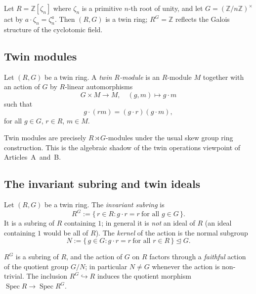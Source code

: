 \documentclass[11pt,a4paper]{article}
\numberwithin{equation}{section}
\newcommand{\Z}{\mathbb{Z}}
\DeclareMathOperator{\Spec}{Spec}
\begin{document}
	\begin{example}
		Let $R=\Z[\zeta_n]$ where $\zeta_n$ is a primitive $n$-th root of unity, and let 
		$G=(\Z/n\Z)^\times$ act by $a\cdot\zeta_n=\zeta_n^a$.
		Then $(R,G)$ is a twin ring; $R^G=\Z$ reflects the Galois structure of the cyclotomic field.
	\end{example}
	
	\subsection{Twin modules}
	
	\begin{definition}
		Let $(R,G)$ be a twin ring.
		A \emph{twin $R$-module} is an $R$-module $M$ together with an action of $G$ by 
		$R$-linear automorphisms
		\[
		G\times M\to M,\quad (g,m)\mapsto g\cdot m
		\]
		such that
		\[
		g\cdot(rm) = (g\cdot r)(g\cdot m),
		\]
		for all $g\in G$, $r\in R$, $m\in M$.
	\end{definition}
	
	\begin{remark}
		Twin modules are precisely $R\rtimes G$-modules under the usual skew group ring construction.
		This is the algebraic shadow of the twin operations viewpoint of Articles~A~and~B.
	\end{remark}
	
	\subsection{The invariant subring and twin ideals}
	
	\begin{definition}
		Let $(R,G)$ be a twin ring.
		The \emph{invariant subring} is
		\[
		R^G := \{\, r\in R : g\cdot r = r\ \text{for all } g\in G\,\}.
		\]
		It is a subring of $R$ containing $1$; in general it is \emph{not} an ideal of $R$ (an ideal
		containing $1$ would be all of $R$). The \emph{kernel} of the action is the normal subgroup
		\[
		N := \{\, g\in G : g\cdot r = r\ \text{for all } r\in R\,\} \trianglelefteq G.
		\]
	\end{definition}
	
	\begin{proposition}
		$R^G$ is a subring of $R$, and the action of $G$ on $R$ factors through a \emph{faithful} action
		of the quotient group $G/N$; in particular $N \neq G$ whenever the action is non-trivial. The
		inclusion $R^G \hookrightarrow R$ induces the quotient morphism $\Spec R \to \Spec R^G$.
	\end{proposition}
	
\end{document}
